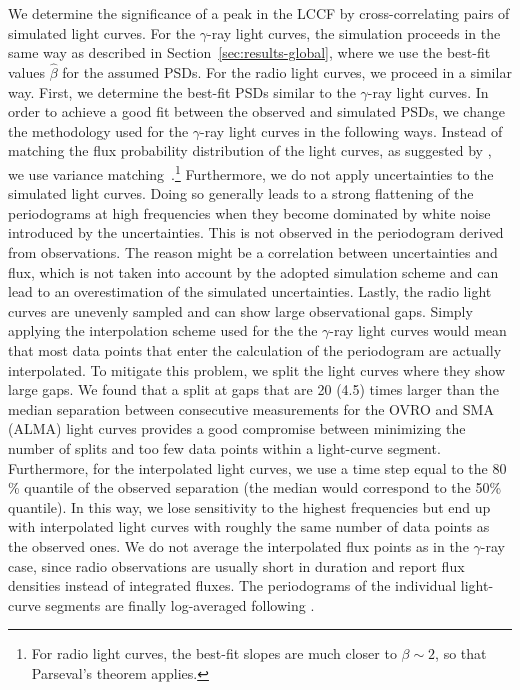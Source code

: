 \documentclass[twocolumn]{aastex62}
\newcommand{\gray}{$\gamma$-ray\xspace}
\begin{document}
We determine the significance of a peak in the LCCF by cross-correlating pairs of simulated light curves. 
For the \gray light curves, the simulation proceeds in the same way as described in Section~\ref{sec:results-global}, where we use the best-fit values $\hat{\beta}$ for the assumed PSDs.
For the radio light curves, we proceed in a similar way. 
First, we determine the best-fit PSDs similar to the \gray light curves. 
In order to achieve a good fit between the observed and simulated PSDs, we change the methodology used for the \gray light curves in the following ways.
Instead of matching the flux probability distribution of the light curves, as suggested by \citet{2013MNRAS.433..907E}, we use variance matching~\citep{2014MNRAS.445..437M}.\footnote{For radio light curves, the best-fit slopes are much closer to $\beta \sim 2$, so that Parseval's theorem applies.}
Furthermore, we do not apply uncertainties to the simulated light curves. 
Doing so generally leads to a strong flattening of the periodograms at high frequencies when they become dominated by white noise introduced by the uncertainties. 
This is not observed in the periodogram derived from observations. 
The reason might be a correlation between uncertainties and flux, which is not taken into account by the adopted simulation scheme and can lead to an overestimation of the simulated uncertainties.
Lastly, the radio light curves are unevenly sampled and can show large observational gaps. 
Simply applying the interpolation scheme used for the the \gray light curves would mean that most data points that enter the calculation of the periodogram are actually interpolated. 
To mitigate this problem, we split the light curves where they show large gaps. 
We found that a split at gaps that are 20 (4.5) times larger than the median separation between consecutive measurements for the OVRO and SMA (ALMA) light curves provides a good compromise between minimizing the number of splits and too few data points within a light-curve segment. 
Furthermore, for the interpolated light curves, we use a time step equal to the 80\,\% quantile of the observed separation (the median would correspond to the 50\% quantile). 
In this way, we lose sensitivity to the highest frequencies but end up with interpolated light curves with roughly the same number of data points as the observed ones. 
We do not average the interpolated flux points as in the \gray case, since radio observations are usually short in duration and report flux densities instead of integrated fluxes. 
The periodograms of the individual light-curve segments are finally log-averaged following \citet{1993MNRAS.261..612P}.
\end{document}
